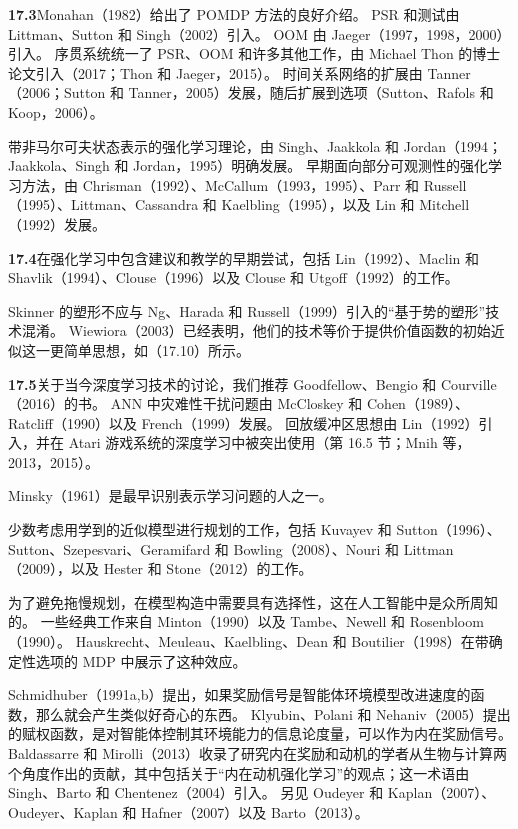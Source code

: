 \documentclass[UTF8,12pt,a4paper,fontset=fandol]{ctexart}
\begin{document}
\noindent\textbf{17.3}\quad Monahan（1982）给出了 POMDP 方法的良好介绍。
PSR 和测试由 Littman、Sutton 和 Singh（2002）引入。
OOM 由 Jaeger（1997，1998，2000）引入。
序贯系统统一了 PSR、OOM 和许多其他工作，由 Michael Thon 的博士论文引入（2017；Thon 和 Jaeger，2015）。
时间关系网络的扩展由 Tanner（2006；Sutton 和 Tanner，2005）发展，随后扩展到选项（Sutton、Rafols 和 Koop，2006）。

带非马尔可夫状态表示的强化学习理论，由 Singh、Jaakkola 和 Jordan（1994；Jaakkola、Singh 和 Jordan，1995）明确发展。
早期面向部分可观测性的强化学习方法，由 Chrisman（1992）、McCallum（1993，1995）、Parr 和 Russell（1995）、Littman、Cassandra 和 Kaelbling（1995），以及 Lin 和 Mitchell（1992）发展。

\noindent\textbf{17.4}\quad 在强化学习中包含建议和教学的早期尝试，包括 Lin（1992）、Maclin 和 Shavlik（1994）、Clouse（1996）以及 Clouse 和 Utgoff（1992）的工作。

Skinner 的塑形不应与 Ng、Harada 和 Russell（1999）引入的“基于势的塑形”技术混淆。
Wiewiora（2003）已经表明，他们的技术等价于提供价值函数的初始近似这一更简单思想，如（17.10）所示。

\noindent\textbf{17.5}\quad 关于当今深度学习技术的讨论，我们推荐 Goodfellow、Bengio 和 Courville（2016）的书。
ANN 中灾难性干扰问题由 McCloskey 和 Cohen（1989）、Ratcliff（1990）以及 French（1999）发展。
回放缓冲区思想由 Lin（1992）引入，并在 Atari 游戏系统的深度学习中被突出使用（第 16.5 节；Mnih 等，2013，2015）。

Minsky（1961）是最早识别表示学习问题的人之一。

少数考虑用学到的近似模型进行规划的工作，包括 Kuvayev 和 Sutton（1996）、Sutton、Szepesvari、Geramifard 和 Bowling（2008）、Nouri 和 Littman（2009），以及 Hester 和 Stone（2012）的工作。

为了避免拖慢规划，在模型构造中需要具有选择性，这在人工智能中是众所周知的。
一些经典工作来自 Minton（1990）以及 Tambe、Newell 和 Rosenbloom（1990）。
Hauskrecht、Meuleau、Kaelbling、Dean 和 Boutilier（1998）在带确定性选项的 MDP 中展示了这种效应。

Schmidhuber（1991a,b）提出，如果奖励信号是智能体环境模型改进速度的函数，那么就会产生类似好奇心的东西。
Klyubin、Polani 和 Nehaniv（2005）提出的赋权函数，是对智能体控制其环境能力的信息论度量，可以作为内在奖励信号。
Baldassarre 和 Mirolli（2013）收录了研究内在奖励和动机的学者从生物与计算两个角度作出的贡献，其中包括关于“内在动机强化学习”的观点；这一术语由 Singh、Barto 和 Chentenez（2004）引入。
另见 Oudeyer 和 Kaplan（2007）、Oudeyer、Kaplan 和 Hafner（2007）以及 Barto（2013）。
\end{document}
